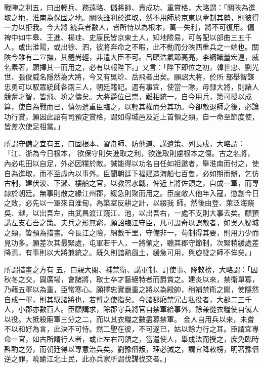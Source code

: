 \begin{pinyinscope}
 戰陣之利五，曰出輕兵、務遠略、儲將帥、責成功、重賞格，大略謂：「關陜為進取之地，淮南為保固之地。關陜雖利於進取，然不用師於京東以牽制其勢，則彼得一力以拒我。今大將
 統兵者數人，皆所恃以為根本，萬一失利，將不可復用。偏裨中如牛皋、王進、楊珪、史康民皆京東土人，知地險易，可各配以部曲三五千人，或出淮陽，或出徐、泗，彼將奔命之不暇，此不動而分陜西重兵之一端也。關陜今雖有二宣撫，其體尚輕，非遣大臣不可。呂頤浩氣節高亮，李綱識量宏遠，威名素著，願擇其一而用之，必有以報陛下。」又言：「陛下即位之初，韓世忠、劉光世、張俊威名隱然為大將，今又有吳玠、岳飛者出矣。願詔大將，於所
 部舉智謀忠勇可以馭眾統師各兩三人，朝廷籍記。遇有事宜，使當一隊，毋隸大將，則諸人競奮才智，皆飛、玠之儔矣。大將爵位已崇，難相統一，自今用兵，第可授以成算，使自為戰而已，慎勿遣重臣臨之，以輕其權而分其功。今卻敵退師之後，必論功行賞，願因此詔有司預定賞格，謂如得城邑及近上首領之類，自一命至節度使，皆差次使足相當。」



 所謂守備之宜有五，曰固根本、習舟師、防他道、講遺策、列長戍，大略謂：「江、浙為今日根本，
 欲保守則失進取之利，欲進取則慮根本之傷。古之名將，內必屯田以自足，外必因糧於敵。誠能得以功名自任如祖逖者，舉淮南而付之，使自為進取，而不至虛內以事外。臣聞朝廷下福建造海船七百隻，必如期而辦，乞仿古制，建伏波、下瀨、樓船之官，以教習水戰，俾近上將佐領之，自成一軍，而專隸於朝廷。無事則散之緣江州郡，緩急則聚而用之。臣度敵人他年入寇，懲創今日之敗，必先以一軍來自淮甸，為築室反耕之計，以綴我
 師。然後由登、萊泛海窺吳、越，以出吾左，由武昌渡江窺江、池，以出吾右，一處不支則大事去矣。願預講左支右吾之策。夫兵之形無窮，願詔臨江守臣，凡可設奇以誤敵者，如吳人疑城之類，皆預為措畫。今長江之險，綿數千里，守備非一，茍制得其要，則用力少而見功多。願差次其最緊處，屯軍若干人，一將領之，聽其郡守節制，次緊稍緩處差降焉，有事則以大將兼統之。既久則諳熟風土，緩急可用，與旋發之師不侔矣。」



 所謂措畫之方有
 五，曰親大閱、補禁衛、講軍制、訂使事、降敕榜，大略謂：「因秋冬之交，闢廣場，會諸將，取士卒才藝絕特者而爵賞之。建炎以來，禁衛單寡，乃藉五軍以為重，臣常寒心。願擇忠實嚴重之將以為殿帥，稍補禁衛之闕，使隱然自成一軍，則其馭諸將也，若臂之使指矣。今諸郡廂禁冗占私役者，大郡二三千人，小郡亦數百人。臣願講求，除郡守兵將官自禁軍給事外，餘兼從衣糧使自僦人以役。大抵殺廂軍三分之二，而以其衣糧之數盡募禁軍。
 金人自用兵以來，未嘗不以和好為言，此決不可恃。然二聖在彼，不可遂已，姑以餘力行之耳。臣謂宜專命一官，如古所謂行人者，或止左右司領之，當遣使人，舉成法而授之，庶免臨時斟酌之勞，而朝廷得以專意治兵矣。劉豫僭叛，理必滅之，謂宜降敕榜，明著豫僭逆之罪，曉諭江北士民，此亦兵家所謂伐謀伐交者。」




\end{pinyinscope}
